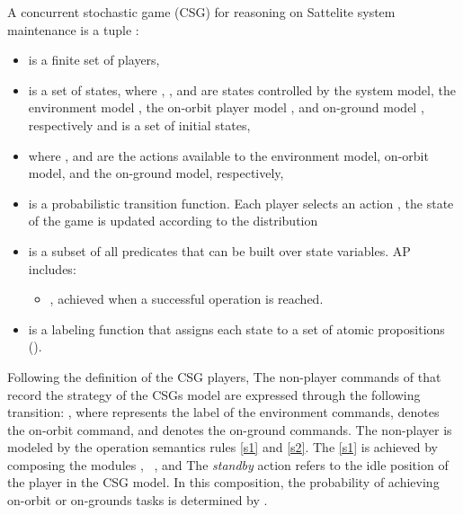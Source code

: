 \begin{mydef} \label{def:csg} \normalfont A concurrent stochastic game (CSG) for reasoning on Sattelite system maintenance is a tuple :

\begin{itemize}
	\item {} is a finite set of players,

 	\item {} is a set of states, where , , and  are states controlled by the system model, the environment model , the on-orbit player model , and on-ground model , respectively 
    and  is a set of initial states,


	 \item {} where ,   and  are the actions available to the environment model, on-orbit model, and the on-ground model, respectively,
    \item {} is a probabilistic transition function. Each player  selects an action \emath{\alpha,\beta,\omega}, the state of the game is updated according to the distribution  

    \item {} is a subset of all predicates that can be built over state variables. AP includes:
    \begin{itemize}
	\item {}, achieved when a successful operation is reached.
     \end{itemize}
    \item {} is a labeling function that assigns each state    to a set of atomic propositions ().
\end{itemize}
\end{mydef}


Following the definition of the CSG players, The non-player commands of  that record the strategy of the CSGs model are expressed through the following transition: , where \emath{\alpha} represents the label of the environment commands, \emath{\beta} denotes the on-orbit command, and \emath{\omega} denotes the on-ground commands. The non-player is modeled by the operation semantics rules \ref{s1} and \ref{s2}. The \ref{s1} is achieved by composing the modules , \ , and  The \emph{standby} action refers to the idle position of the player in the CSG model. In this composition, the probability of achieving on-orbit or on-grounds tasks is determined by .


